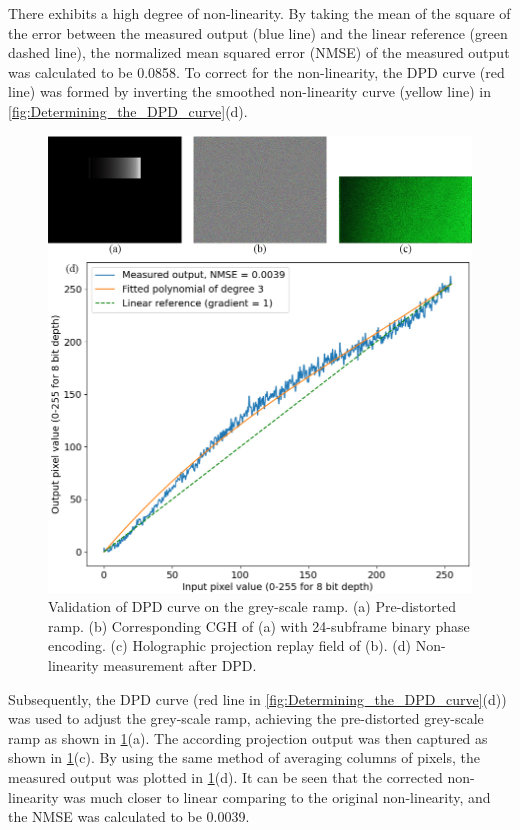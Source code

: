 There exhibits a high degree of non-linearity. By taking the mean of the square of the error between the measured output (blue line) and the linear reference (green dashed line), the normalized mean squared error (NMSE) of the measured output was calculated to be 0.0858. To correct for the non-linearity, the DPD curve (red line) was formed by inverting the smoothed non-linearity curve (yellow line) in \cref{fig:Determining_the_DPD_curve}(d).

\begin{figure}[H]
    \centering
    \includegraphics[width=\textwidth]{Validation_of_DPD_curve_on_the_grey-scale_ramp.jpg}
    \caption{Validation of DPD curve on the grey-scale ramp. (a) Pre-distorted ramp. (b) Corresponding CGH of (a) with 24-subframe binary phase encoding. (c) Holographic projection replay field of (b). (d) Non-linearity measurement after DPD.}
    \label{fig:Validation of DPD curve on the grey-scale ramp}
\end{figure}
\vspace{3mm}

Subsequently, the DPD curve (red line in \cref{fig:Determining_the_DPD_curve}(d)) was used to adjust the grey-scale ramp, achieving the pre-distorted grey-scale ramp as shown in \cref{fig:Validation of DPD curve on the grey-scale ramp}(a). The according projection output was then captured as shown in \cref{fig:Validation of DPD curve on the grey-scale ramp}(c). By using the same method of averaging columns of pixels, the measured output was plotted in \cref{fig:Validation of DPD curve on the grey-scale ramp}(d). It can be seen that the corrected non-linearity was much closer to linear comparing to the original non-linearity, and the NMSE was calculated to be 0.0039.

